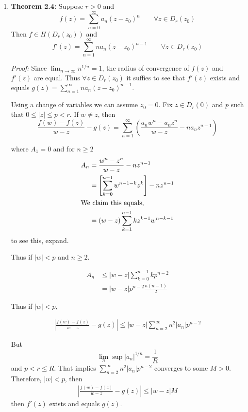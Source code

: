 \documentclass[12pt]{article}
\begin{document}
\begin{enumerate}
    \begin{align*}
        f'(z) &= \overline z + \lim_{y \to 0} \frac{-y}{y} = \overline z - z
    \end{align*}
    Then, $f'(z)$ exists only if $z = 0$ and $f'(0) = 0$. 

    \item \textbf{Theorem 2.4:} Suppose $r > 0$ and 
    \[f(z) = \sum_{n=0}^\infty a_n (z - z_0)^n \qquad \forall z \in D_r(z_0)\]
    Then $f  \in H(D_r(z_0))$ and 
    \[f'(z) = \sum_{n=1}^\infty na_n (z - z_0)^{n-1} \qquad \forall z \in D_r(z_0)\]

    \textit{Proof:}
    Since $\lim_{n\to \infty}n^{1/n} = 1$, the radius of convergence of $f(z)$ and $f'(z)$ are equal. Thus $\forall z \in D_r(z_0)$ it suffies to see that $f'(z)$ exists and equals $g(z) = \sum_{n=1}^\infty na_n (z - z_0)^{n-1}$. 
    
    Using a change of variables we can assume $z_0 = 0$. Fix $z \in D_r(0)$ and $p$ such that $0 \leq |z| \leq p < r$. If $ w\neq z$, then 
    \[\frac{f(w)- f(z)}{w -z} - g(z) = \sum_{n=1}^\infty \left(\frac{a_nw^n - a_nz^n}{w-z} - na_nz^{n-1}\right)\]

    where $A_1 = 0$ and for $n \geq 2$ 
    \begin{align*}
        A_n &= \frac{w^n - z^n}{w-z} - nz^{n-1} \\ 
        &= \left[\sum_{k=0}^{n-1} w^{n-1-k}z^k \right] - nz^{n-1} \\ 
        \intertext{We claim this equals,}
        &= (w-z) \sum_{k=1}^{n-1} kz^{k-1}w^{n-k-1}
    \end{align*}
    to see this, expand. 


    Thus if $|w| < p$ and $n \geq 2$. 

    \begin{align*}
        A_n &\leq |w -z| \sum_{k=0}^{n-1}kp^{n-2} \\ 
        &= |w-z| p^{n-2}\frac{n(n-1)}{2}
    \end{align*}
    
    Thus if $|w| < p$, 

    \begin{align*}
        \left|\frac{f(w) - f(z)}{w-z} - g(z)\right| \leq |w-z| \sum_{n=2}^\infty n^2 |a_n| p^{n-2}
    \end{align*}

    But 
    \[\lim_n \sup |a_n|^{1/n} = \frac{1}{R}\] 
    and $ p < r \leq R$. That implies $\sum_{n=2}^\infty n^2|a_n|p^{n-2}$ converges to some $M > 0$. Therefore, $|w| < p$, then  
    \begin{align*}
        \left|\frac{f(w) - f(z)}{w-z} - g(z)\right| \leq |w-z| M
    \end{align*}
    then $f'(z)$ exists and equals $g(z)$. 


\end{enumerate}
\end{document}
